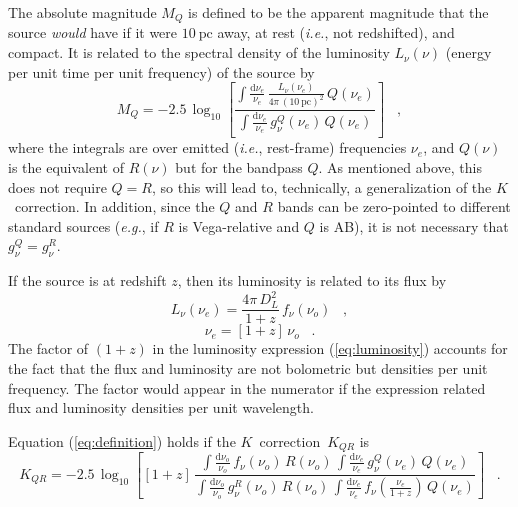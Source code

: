\documentclass[preprint]{aastex}
\newcommand{\kcorrection}{$K$~correction}
\newcommand{\nuobs}{\nu_o}
\newcommand{\nuemit}{\nu_e}
\newcommand{\latin}[1]{\textsl{#1}}
\providecommand{\ie}{\latin{i.e.}}
\providecommand{\eg}{\latin{e.g.}}
\begin{document}
The absolute magnitude $M_Q$ is defined to be the apparent magnitude
that the source \emph{would} have if it were $10~\mathrm{pc}$ away, at
rest (\ie, not redshifted), and compact.  It is related to the
spectral density of the luminosity $L_{\nu}(\nu)$ (energy per unit
time per unit frequency) of the source by
\begin{equation}
M_Q = -2.5\,\log_{10}\left[
  \frac{\displaystyle
          \int\frac{\mathrm{d}\nuemit}{\nuemit}\,
              \frac{L_{\nu}(\nuemit)}{4\pi\,(10~\mathrm{pc})^2}\,Q(\nuemit)}
       {\displaystyle
          \int\frac{\mathrm{d}\nuemit}{\nuemit}\,g^Q_{\nu}(\nuemit)\,Q(\nuemit)}
\right] \;\;\;,
\end{equation}
where the integrals are over emitted (\ie, rest-frame) frequencies
$\nuemit$, and $Q(\nu)$ is the equivalent of $R(\nu)$ but for the
bandpass $Q$.  As mentioned above, this does not require $Q=R$, so
this will lead to, technically, a generalization of the \kcorrection.
In addition, since the $Q$ and $R$ bands can be zero-pointed to
different standard sources (\eg, if $R$ is Vega-relative and $Q$ is
AB), it is not necessary that $g^Q_{\nu}=g^R_{\nu}$.

If the source is at redshift $z$, then its luminosity is related to
its flux by
\begin{equation}
\label{eq:luminosity}
L_{\nu}(\nuemit) = \frac{4\pi\,D_L^2}{1+z}\,f_{\nu}(\nuobs) \;\;\;,
\end{equation}
\begin{equation}
\nuemit = [1+z]\,\nuobs \;\;\;.
\end{equation}
The factor of $(1+z)$ in the luminosity expression
(\ref{eq:luminosity}) accounts for the fact that the flux and
luminosity are not bolometric but densities per unit frequency.  The
factor would appear in the numerator if the expression related flux
and luminosity densities per unit wavelength.

Equation (\ref{eq:definition}) holds if the \kcorrection\ $K_{QR}$ is
\begin{equation}
\label{eq:kcorrection}
K_{QR} = -2.5\,\log_{10}\left[[1+z]\,
  \frac{\displaystyle
          \int\frac{\mathrm{d}\nuobs}{\nuobs}\,f_{\nu}(\nuobs)\,R(\nuobs)\,
          \int\frac{\mathrm{d}\nuemit}{\nuemit}\,g^Q_{\nu}(\nuemit)\,Q(\nuemit)}
       {\displaystyle
          \int\frac{\mathrm{d}\nuobs}{\nuobs}\,g^R_{\nu}(\nuobs)\,R(\nuobs)\,
          \int\frac{\mathrm{d}\nuemit}{\nuemit}\,
            f_{\nu}\!\left(\frac{\nuemit}{1+z}\right)\,Q(\nuemit)}
\right] \;\;\;.
\end{equation}
\end{document}
